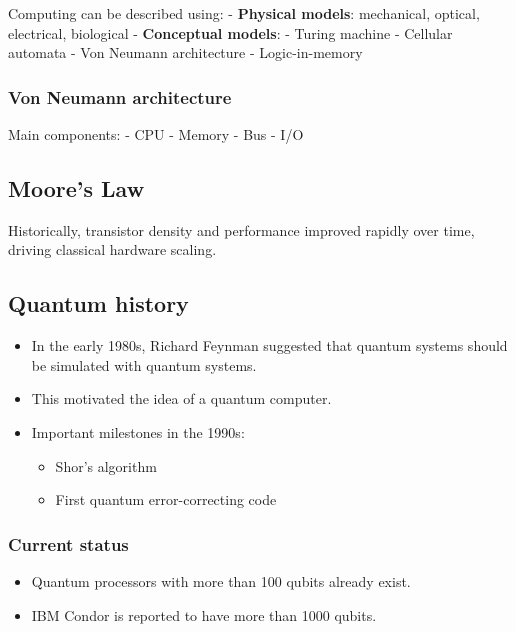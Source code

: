 \documentclass[
]{article}
\providecommand{\tightlist}{%
  \setlength{\itemsep}{0pt}\setlength{\parskip}{0pt}}
\begin{document}
Computing can be described using: - \textbf{Physical models}:
mechanical, optical, electrical, biological - \textbf{Conceptual
models}: - Turing machine - Cellular automata - Von Neumann architecture
- Logic-in-memory

\subsubsection{Von Neumann architecture}\label{von-neumann-architecture}

Main components: - CPU - Memory - Bus - I/O

\subsection{Moore's Law}\label{moores-law}

Historically, transistor density and performance improved rapidly over
time, driving classical hardware scaling.

\subsection{Quantum history}\label{quantum-history}

\begin{itemize}
\tightlist
\item
  In the early 1980s, Richard Feynman suggested that quantum systems
  should be simulated with quantum systems.
\item
  This motivated the idea of a quantum computer.
\item
  Important milestones in the 1990s:

  \begin{itemize}
  \tightlist
  \item
    Shor's algorithm
  \item
    First quantum error-correcting code
  \end{itemize}
\end{itemize}

\subsubsection{Current status}\label{current-status}

\begin{itemize}
\tightlist
\item
  Quantum processors with more than 100 qubits already exist.
\item
  IBM Condor is reported to have more than 1000 qubits.
\end{itemize}
\end{document}
